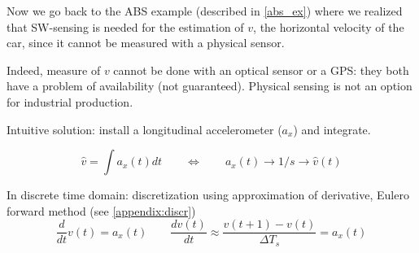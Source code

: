 \begin{example}
Now we go back to the ABS example (described in \ref{abs_ex}) where we realized that SW-sensing is needed for the estimation of $v$, the horizontal velocity of the car, since it cannot be measured with a physical sensor.
    \begin{figure}[H]
        \centering
    \end{figure}

    
    Indeed, measure of $v$ cannot be done with an optical sensor or a GPS:
    they both have a problem of availability (not guaranteed). Physical sensing is not an option for industrial production.

    Intuitive solution: install a longitudinal accelerometer ($a_x$) and integrate.
    \begin{figure}[H]
        \centering
    \end{figure}
    \[
        \hat{v} = \int a_x(t) dt \qquad \iff \qquad a_x(t) \rightarrow 1/s \rightarrow \hat{v}(t)
    \]

    In discrete time domain: discretization using approximation of derivative, Eulero forward method (see \ref{appendix:discr})
    \[
        \frac{d}{dt} v(t) = a_x(t) \qquad \frac{dv(t)}{dt} \approx \frac{v(t+1)-v(t)}{\Delta T_s} = a_x(t)
    \]


\end{example}
